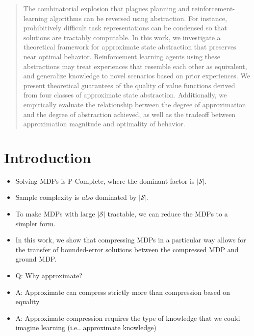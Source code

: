 \documentclass{article}
\begin{document}


\begin{abstract}
The combinatorial explosion that plagues planning and reinforcement-learning algorithms can be reversed using abstraction. For instance, prohibitively difficult task representations can be condensed so that solutions are tractably computable. In this work, we investigate a theoretical framework for approximate state abstraction that preserves near optimal behavior. Reinforcement learning agents using these abstractions may treat experiences that resemble each other as equivalent, and generalize knowledge to novel scenarios based on prior experiences. We present theoretical guarantees of the quality of value functions derived from four classes of approximate state abstraction. Additionally, we empirically evaluate the relationship between the degree of approximation and the degree of abstraction achieved, as well as the tradeoff between approximation magnitude and optimality of behavior.
\end{abstract}



\section{Introduction}

\begin{itemize}
\item Solving MDPs is P-Complete, where the dominant factor is $|\mathcal{S}|$.
\item Sample complexity is {\it also} dominated by $|\mathcal{S}|$.
\item To make MDPs with large $|\mathcal{S}|$ tractable, we can reduce the MDPs to a simpler form.
\item In this work, we show that compressing MDPs in a particular way allows for the transfer of bounded-error solutions between the compressed MDP and ground MDP.
\item Q: Why approximate?
\item A: Approximate can compress strictly more than compression based on equality
\item A: Approximate compression requires the type of knowledge that we could imagine learning (i.e.. approximate knowledge)
\end{itemize}
\end{document}
